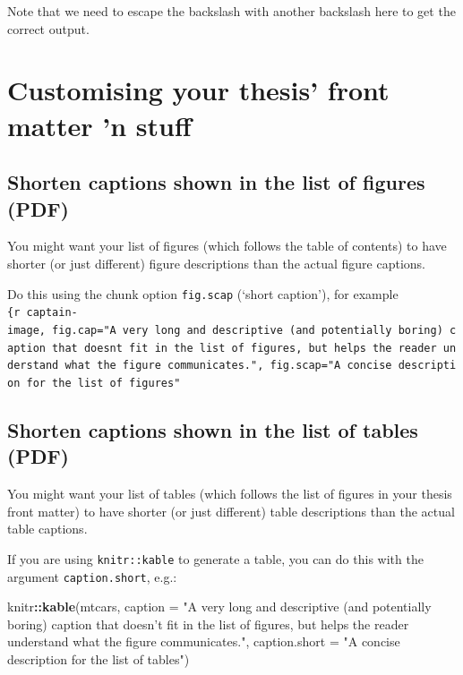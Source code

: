 \documentclass[a4paper, twoside]{templates/ociamthesis}
\newenvironment{Shaded}{\begin{snugshade}}{\end{snugshade}}
\newcommand{\DataTypeTok}[1]{\textcolor[rgb]{0.13,0.29,0.53}{#1}}
\newcommand{\KeywordTok}[1]{\textcolor[rgb]{0.13,0.29,0.53}{\textbf{#1}}}
\newcommand{\NormalTok}[1]{#1}
\newcommand{\OperatorTok}[1]{\textcolor[rgb]{0.81,0.36,0.00}{\textbf{#1}}}
\newcommand{\StringTok}[1]{\textcolor[rgb]{0.31,0.60,0.02}{#1}}
\renewenvironment{Shaded}
{
  \vspace{4pt}%
  \begin{snugshade}%
}{%
  \end{snugshade}%
  \vspace{4pt}%
}
\begin{document}
Note that we need to escape the backslash with another backslash here to get the correct output.

\hypertarget{customising-your-thesis-front-matter-n-stuff}{%
\section{Customising your thesis' front matter 'n stuff}\label{customising-your-thesis-front-matter-n-stuff}}

\hypertarget{shorten-captions-shown-in-the-list-of-figures-pdf}{%
\subsection{Shorten captions shown in the list of figures (PDF)}\label{shorten-captions-shown-in-the-list-of-figures-pdf}}

You might want your list of figures (which follows the table of contents) to have shorter (or just different) figure descriptions than the actual figure captions.

Do this using the chunk option \texttt{fig.scap} (`short caption'), for example \texttt{\{r\ captain-image,\ fig.cap="A\ very\ long\ and\ descriptive\ (and\ potentially\ boring)\ caption\ that\ doesn\textquotesingle{}t\ fit\ in\ the\ list\ of\ figures,\ but\ helps\ the\ reader\ understand\ what\ the\ figure\ communicates.",\ fig.scap="A\ concise\ description\ for\ the\ list\ of\ figures"}

\hypertarget{shorten-captions-shown-in-the-list-of-tables-pdf}{%
\subsection{Shorten captions shown in the list of tables (PDF)}\label{shorten-captions-shown-in-the-list-of-tables-pdf}}

You might want your list of tables (which follows the list of figures in your thesis front matter) to have shorter (or just different) table descriptions than the actual table captions.

If you are using \texttt{knitr::kable} to generate a table, you can do this with the argument \texttt{caption.short}, e.g.:

\begin{Shaded}
\begin{Highlighting}[]
\NormalTok{knitr}\OperatorTok{::}\KeywordTok{kable}\NormalTok{(mtcars,}
              \DataTypeTok{caption =} \StringTok{"A very long and descriptive (and potentially}
\StringTok{              boring) caption that doesn't fit in the list of figures,}
\StringTok{              but helps the reader understand what the figure }
\StringTok{              communicates."}\NormalTok{,}
              \DataTypeTok{caption.short =} \StringTok{"A concise description for the list of tables"}\NormalTok{)}
\end{Highlighting}
\end{Shaded}
\end{document}
